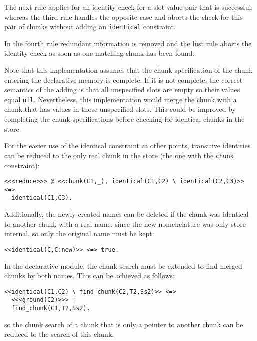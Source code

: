 The next rule applies for an identity check for a slot-value pair that is successful, whereas the third rule handles the opposite case and aborts the check for this pair of chunks without adding an \lstinline|identical| constraint.

In the fourth rule redundant information is removed and the lust rule aborts the identity check as soon as one matching chunk has been found.

Note that this implementation assumes that the chunk specification of the chunk entering the declarative memory is complete. If it is not complete, the correct semantics of the adding is that all unspecified slots are empty so their values equal \lstinline|nil|. Nevertheless, this implementation would merge the chunk with a chunk that has values in those unspecified slots. This could be improved by completing the chunk specifications before checking for identical chunks in the store.

For the easier use of the identical constraint at other points, transitive identities can be reduced to the only real chunk in the store (the one with the \lstinline|chunk| constraint):

\begin{lstlisting}
<<<reduce>>> @ <<chunk(C1,_), identical(C1,C2) \ identical(C2,C3)>> <=> 
  identical(C1,C3).
\end{lstlisting}

Additionally, the newly created names can be deleted if the chunk was identical to another chunk with a real name, since the new nomenclature was only store internal, so only the original name must be kept:

\begin{lstlisting}
<<identical(C,C:new)>> <=> true.
\end{lstlisting}

In the declarative module, the chunk search must be extended to find merged chunks by both names. This can be achieved as follows:

\begin{lstlisting}
<<identical(C1,C2) \ find_chunk(C2,T2,Ss2)>> <=> 
  <<<ground(C2)>>> | 
  find_chunk(C1,T2,Ss2).
\end{lstlisting}

so the chunk search of a chunk that is only a pointer to another chunk can be reduced to the search of this chunk. 


